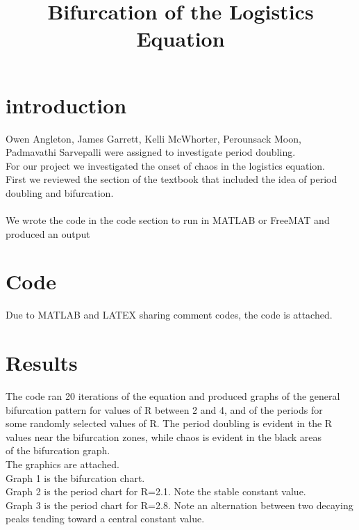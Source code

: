 \documentclass{amsart}
\begin{document}
 

\title{Bifurcation of the Logistics Equation}
\section {introduction}
Owen Angleton, James Garrett, Kelli McWhorter, Perounsack Moon,\\
Padmavathi Sarvepalli were assigned to investigate period doubling.\\
For our project we investigated the onset of chaos in the logistics equation.\\
First we reviewed the section of the textbook that included the idea of period\\
doubling and bifurcation.\\
\\
We wrote the code in the code section to run in MATLAB or FreeMAT and produced an output\\

\section {Code}
Due to MATLAB and LATEX sharing comment codes, the code is attached.\\

\section{Results}
The code ran 20 iterations of the equation and produced graphs of the general\\
bifurcation pattern for values of R between 2 and 4, and of the periods for \\
some randomly selected values of R.  The period doubling is evident in the R \\
values near the bifurcation zones, while chaos is evident in the black areas \\
of the bifurcation graph.\\

The graphics are attached.\\

Graph 1 is the bifurcation chart.\\


Graph 2 is the period chart for R=2.1.  Note the stable constant value.\\

Graph 3 is the period chart for R=2.8. Note an alternation between two 
decaying peaks tending toward a central constant value.  \\
\end{document}
